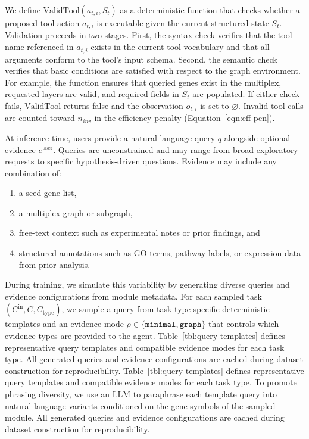 \documentclass[thesis,letterpaper,12pt]{utthesis}
\begin{document}
We define $\text{ValidTool}(a_{t,i}, S_t)$ as a deterministic function that checks whether a proposed tool action $a_{t,i}$ is executable given the current structured state $S_t$. Validation proceeds in two stages. First, the syntax check verifies that the tool name referenced in $a_{t,i}$ exists in the current tool vocabulary and that all arguments conform to the tool's input schema. Second, the semantic check verifies that basic conditions are satisfied with respect to the graph environment. For example, the function ensures that queried genes exist in the multiplex, requested layers are valid, and required fields in $S_t$ are populated. If either check fails, $\text{ValidTool}$ returns false and the observation $o_{t,i}$ is set to $\varnothing$. Invalid tool calls are counted toward $n_{inv}$ in the efficiency penalty (Equation~\ref{eqn:eff-pen}).

At inference time, users provide a natural language query $q$ alongside optional evidence $e^{\text{user}}$. Queries are unconstrained and may range from broad exploratory requests to specific hypothesis-driven questions. Evidence may include any combination of:
\begin{enumerate}
    \item a seed gene list,
    \item a multiplex graph or subgraph,
    \item free-text context such as experimental notes or prior findings, and
    \item structured annotations such as GO terms, pathway labels, or expression data from prior analysis.
\end{enumerate}

During training, we simulate this variability by generating diverse queries and evidence configurations from module metadata. For each sampled task $(C^{\text{in}}, C, C_{\text{type}})$, we sample a query from task-type-specific deterministic templates and an evidence mode $\rho \in \{\texttt{minimal}, \texttt{graph}\}$ that controls which evidence types are provided to the agent. Table~\ref{tbl:query-templates} defines representative query templates and compatible evidence modes for each task type. All generated queries and evidence configurations are cached during dataset construction for reproducibility. Table~\ref{tbl:query-templates} defines representative query templates and compatible evidence modes for each task type. To promote phrasing diversity, we use an LLM to paraphrase each template query into natural language variants conditioned on the gene symbols of the sampled module. All generated queries and evidence configurations are cached during dataset construction for reproducibility.
\end{document}

